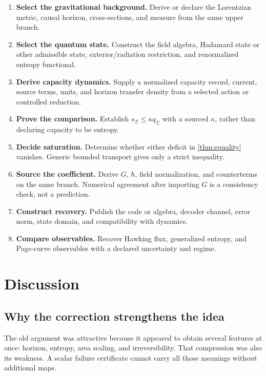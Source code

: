 \documentclass[11pt,a4paper]{article}
\numberwithin{equation}{section}
\theoremstyle{definition}
\theoremstyle{remark}
\begin{document}
\begin{enumerate}[leftmargin=2em]
\item \textbf{Select the gravitational background.}
  Derive or declare the Lorentzian metric, causal horizon, cross-sections,
  and measure from the same upper branch.
\item \textbf{Select the quantum state.}
  Construct the field algebra, Hadamard state or other admissible state,
  exterior/radiation restriction, and renormalized entropy functional.
\item \textbf{Derive capacity dynamics.}
  Supply a normalized capacity record, current, source terms, units, and
  horizon transfer density from a selected action or controlled
  reduction.
\item \textbf{Prove the comparison.}
  Establish \(s_\Sigma\leq\kappa q_\Sigma\) with a sourced \(\kappa\),
  rather than declaring capacity to be entropy.
\item \textbf{Decide saturation.}
  Determine whether either deficit in \cref{thm:equality} vanishes.
  Generic bounded transport gives only a strict inequality.
\item \textbf{Source the coefficient.}
  Derive \(G\), \(\hbar\), field normalization, and counterterms on the
  same branch.  Numerical agreement after importing \(G\) is a
  consistency check, not a prediction.
\item \textbf{Construct recovery.}
  Publish the code or algebra, decoder channel, error norm, state domain,
  and compatibility with dynamics.
\item \textbf{Compare observables.}
  Recover Hawking flux, generalized entropy, and Page-curve observables
  with a declared uncertainty and regime.
\end{enumerate}

\section{Discussion}

\subsection{Why the correction strengthens the idea}

The old argument was attractive because it appeared to obtain several
features at once: horizon, entropy, area scaling, and irreversibility.
That compression was also its weakness.  A scalar failure certificate
cannot carry all those meanings without additional maps.
\end{document}
